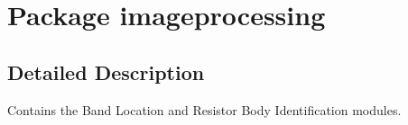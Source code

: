 \hypertarget{namespaceimageprocessing}{}\section{Package imageprocessing}
\label{namespaceimageprocessing}


\subsection{Detailed Description}
Contains the Band Location and Resistor Body Identification modules. 